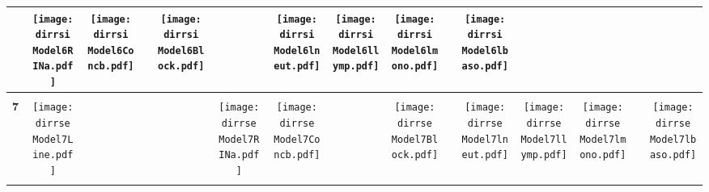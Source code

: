 \documentclass[landscape]{article}
\def \dirrsi{/run/user/1000/gvfs/smb-share:server=cyfiles.iastate.edu,share=09/22/ntyet/R/RA/Data/RFI-newdata/resultpaired/Model6.Line.Concb.RINb.RINa.lneut.llymp.lmono.lbaso.Block/}
\def \dirrse{/run/user/1000/gvfs/smb-share:server=cyfiles.iastate.edu,share=09/22/ntyet/R/RA/Data/RFI-newdata/resultpaired/Model7.Line.Concb.RINa.lneut.llymp.lmono.lbaso.Block/}
\begin{document}
\begin{table}
\begin{tabular}{ccccccccccccccc}
      &\texttt{[image: \\dirrsi Model6RINa.pdf]}
      &\texttt{[image: \\dirrsi Model6Concb.pdf]}
      &
      &\texttt{[image: \\dirrsi Model6Block.pdf]}
      &
      &\texttt{[image: \\dirrsi Model6lneut.pdf]}
      &\texttt{[image: \\dirrsi Model6llymp.pdf]}
      &\texttt{[image: \\dirrsi Model6lmono.pdf]}
      &
      &\texttt{[image: \\dirrsi Model6lbaso.pdf]}
     \\[3.5pt]
     \hline
     \\[3.5pt]
     {\Huge \textbf{7}} 
      &\texttt{[image: \\dirrse Model7Line.pdf]}
      &
      &
      &
      &\texttt{[image: \\dirrse Model7RINa.pdf]}
      &\texttt{[image: \\dirrse Model7Concb.pdf]}
      &
      &\texttt{[image: \\dirrse Model7Block.pdf]}
      &
      &\texttt{[image: \\dirrse Model7lneut.pdf]}
      &\texttt{[image: \\dirrse Model7llymp.pdf]}
      &\texttt{[image: \\dirrse Model7lmono.pdf]}
      &
      &\texttt{[image: \\dirrse Model7lbaso.pdf]}
     \\[3.5pt]
     \hline
     \\[3.5pt]

\end{tabular}
\end{table}
\end{document}

